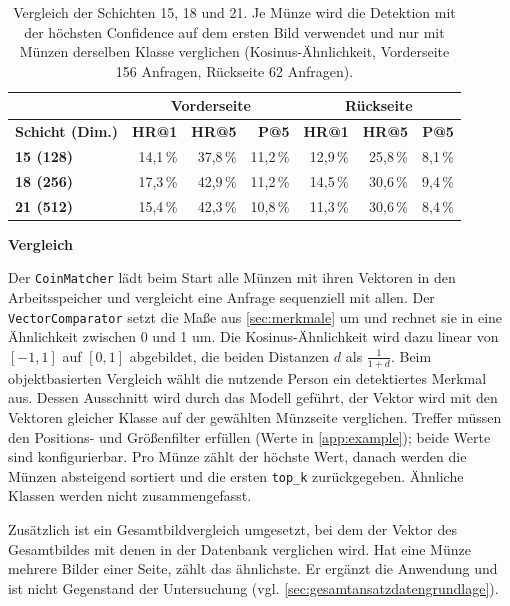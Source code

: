 \begin{table}[H]
\centering
\small
\caption{Vergleich der Schichten 15, 18 und 21. Je Münze wird die Detektion mit der höchsten Confidence auf dem ersten Bild verwendet und nur mit Münzen derselben Klasse verglichen (Kosinus-Ähnlichkeit, Vorderseite 156 Anfragen, Rückseite 62 Anfragen).}
\label{tab:schichten-merkmale}
\begin{tabular}{|l|r|r|r|r|r|r|}
\hline
 & \multicolumn{3}{c|}{\textbf{Vorderseite}} & \multicolumn{3}{c|}{\textbf{Rückseite}} \\ \hline
\textbf{Schicht (Dim.)} & \textbf{HR@1} & \textbf{HR@5} & \textbf{P@5} & \textbf{HR@1} & \textbf{HR@5} & \textbf{P@5} \\ \hline
\textbf{15 (128)} & 14{,}1\,\% & 37{,}8\,\% & 11{,}2\,\% & 12{,}9\,\% & 25{,}8\,\% & 8{,}1\,\% \\ \hline
\textbf{18 (256)} & 17{,}3\,\% & 42{,}9\,\% & 11{,}2\,\% & 14{,}5\,\% & 30{,}6\,\% & 9{,}4\,\% \\ \hline
\textbf{21 (512)} & 15{,}4\,\% & 42{,}3\,\% & 10{,}8\,\% & 11{,}3\,\% & 30{,}6\,\% & 8{,}4\,\% \\ \hline
\end{tabular}
\end{table}

\vspace{\baselineskip}

\noindent \textbf{Vergleich}

\noindent Der \lstinline|CoinMatcher| lädt beim Start alle Münzen mit ihren Vektoren in den Arbeitsspeicher und vergleicht eine Anfrage sequenziell mit allen. Der \lstinline|VectorComparator| setzt die Maße aus \cref{sec:merkmale} um und rechnet sie in eine Ähnlichkeit zwischen 0 und 1 um. Die Kosinus-Ähnlichkeit wird dazu linear von $ [-1, 1] $ auf $ [0, 1] $ abgebildet, die beiden Distanzen $ d $ als $ \frac{1}{1+d} $. Beim objektbasierten Vergleich wählt die nutzende Person ein detektiertes Merkmal aus. Dessen Ausschnitt wird durch das Modell geführt, der Vektor wird  mit den Vektoren gleicher Klasse auf der gewählten Münzseite verglichen. Treffer müssen den Positions- und Größenfilter erfüllen (Werte in \cref{app:example}); beide Werte sind konfigurierbar. Pro Münze zählt der höchste Wert, danach werden die Münzen absteigend sortiert und die ersten \lstinline|top_k| zurückgegeben. Ähnliche Klassen werden nicht zusammengefasst.

Zusätzlich ist ein Gesamtbildvergleich umgesetzt, bei dem der Vektor des Gesamtbildes mit denen in der Datenbank verglichen wird. Hat eine Münze mehrere Bilder einer Seite, zählt das ähnlichste. Er ergänzt die Anwendung und ist nicht Gegenstand der Untersuchung (vgl. \cref{sec:gesamtansatzdatengrundlage}).

